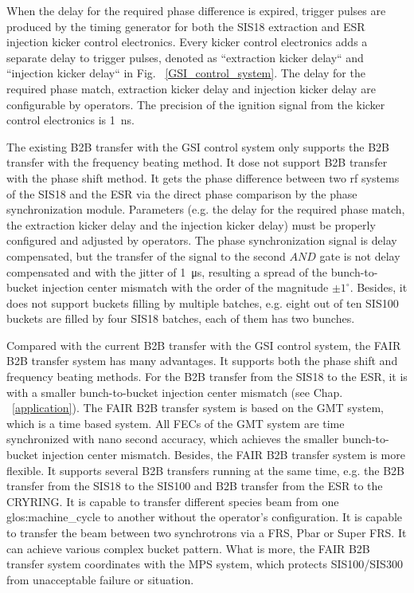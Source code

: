 When the delay for the required phase difference is expired, trigger pulses are produced by the timing generator for both the SIS18 extraction and ESR injection kicker control electronics. Every kicker control electronics adds a separate delay to trigger pulses, denoted as ``extraction kicker delay`` and ``injection kicker delay`` in Fig. ~\ref{GSI_control_system}. The delay for the required phase match, extraction kicker delay and injection kicker delay are configurable by operators. The precision of the ignition signal from the kicker control electronics is \SI{1}{ns}. 

The existing B2B transfer with the GSI control system only supports the B2B transfer with the frequency beating method. It dose not support B2B transfer with the phase shift method. It gets the phase difference between two rf systems of the SIS18 and the ESR via the direct phase comparison by the phase synchronization module. Parameters (e.g. the delay for the required phase match, the extraction kicker delay and the injection kicker delay) must be properly configured and adjusted by operators. The phase synchronization signal is delay compensated, but the transfer of the signal to the second $\textit{AND}$ gate is not delay compensated and with the jitter of \SI{1}{\micro\second}, resulting a spread of the bunch-to-bucket injection center mismatch with the order of the magnitude $\pm 1^\circ$. Besides, it does not support buckets filling by multiple batches, e.g. eight out of ten SIS100 buckets are filled by four SIS18 batches, each of them has two bunches.

Compared with the current B2B transfer with the GSI control system, the FAIR B2B transfer system has many advantages. It supports both the phase shift and frequency beating methods. For the B2B transfer from the SIS18 to the ESR, it is with a smaller bunch-to-bucket injection center mismatch (see Chap. ~\ref{application}). The FAIR B2B transfer system is based on the GMT system, which is a time based system. All FECs of the GMT system are time synchronized with nano second accuracy, which achieves the smaller bunch-to-bucket injection center mismatch. Besides, the FAIR B2B transfer system is more flexible. It supports several B2B transfers running at the same time, e.g. the B2B transfer from the SIS18 to the SIS100 and B2B transfer from the ESR to the CRYRING. It is capable to transfer different species beam from one \gls{glos:machine_cycle} to another without the operator's configuration. It is capable to transfer the beam between two synchrotrons via a \gls{FRS}, Pbar or Super FRS. It can achieve various complex bucket pattern. What is more, the FAIR B2B transfer system coordinates with the MPS system, which protects SIS100/SIS300 from unacceptable failure or situation. 


